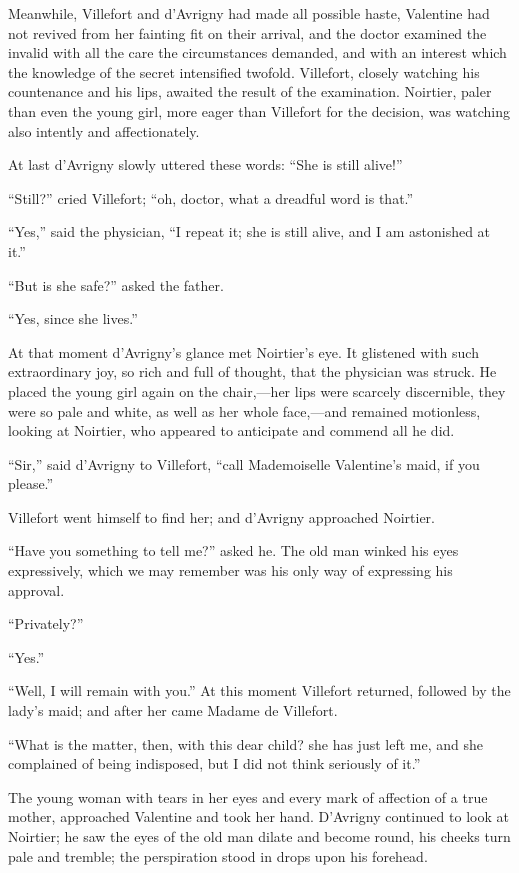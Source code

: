 Meanwhile, Villefort and d’Avrigny had made all possible haste,
Valentine had not revived from her fainting fit on their arrival, and
the doctor examined the invalid with all the care the circumstances
demanded, and with an interest which the knowledge of the secret
intensified twofold. Villefort, closely watching his countenance and
his lips, awaited the result of the examination. Noirtier, paler than
even the young girl, more eager than Villefort for the decision, was
watching also intently and affectionately.

At last d’Avrigny slowly uttered these words: “She is still alive!”

“Still?” cried Villefort; “oh, doctor, what a dreadful word is that.”

“Yes,” said the physician, “I repeat it; she is still alive, and I am
astonished at it.”

“But is she safe?” asked the father.

“Yes, since she lives.”

At that moment d’Avrigny’s glance met Noirtier’s eye. It glistened with
such extraordinary joy, so rich and full of thought, that the physician
was struck. He placed the young girl again on the chair,—her lips were
scarcely discernible, they were so pale and white, as well as her whole
face,—and remained motionless, looking at Noirtier, who appeared to
anticipate and commend all he did.

“Sir,” said d’Avrigny to Villefort, “call Mademoiselle Valentine’s
maid, if you please.”

Villefort went himself to find her; and d’Avrigny approached Noirtier.

“Have you something to tell me?” asked he. The old man winked his eyes
expressively, which we may remember was his only way of expressing his
approval.

“Privately?”

“Yes.”

“Well, I will remain with you.” At this moment Villefort returned,
followed by the lady’s maid; and after her came Madame de Villefort.

“What is the matter, then, with this dear child? she has just left me,
and she complained of being indisposed, but I did not think seriously
of it.”

The young woman with tears in her eyes and every mark of affection of a
true mother, approached Valentine and took her hand. D’Avrigny
continued to look at Noirtier; he saw the eyes of the old man dilate
and become round, his cheeks turn pale and tremble; the perspiration
stood in drops upon his forehead.

